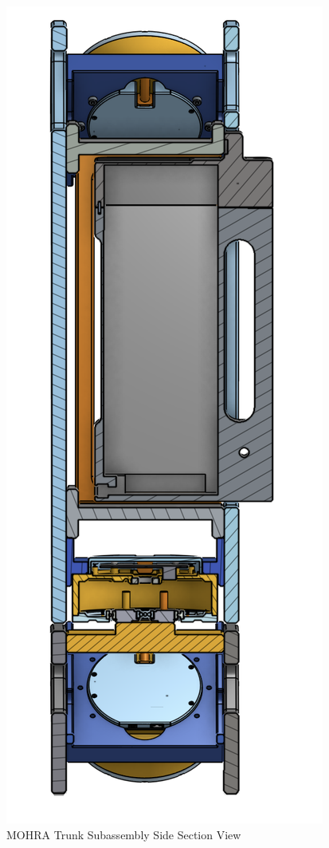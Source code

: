 \documentclass{article}
\begin{document}
\begin{figure}[H]
    \centering
    \includegraphics[scale=0.9]{assets/Design Presentation/Trunk Section View.png}
    \caption{MOHRA Trunk Subassembly Side Section View}
    \label{fig:enter-label}
\end{figure}
\end{document}
